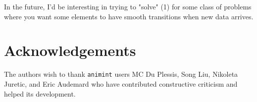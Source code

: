 \documentclass[journal]{vgtc}\usepackage[]{graphicx}\usepackage[]{color}
\begin{document}
In the future, I'd be interesting in trying to "solve" (1) for some
class of problems where you want some elements to have smooth
transitions when new data arrives.

\section*{Acknowledgements}

The authors wish to thank \texttt{animint} users MC Du Plessis, Song Liu,
Nikoleta Juretic, and Eric Audemard
who have contributed constructive criticism and helped its development.

%



\end{document}
